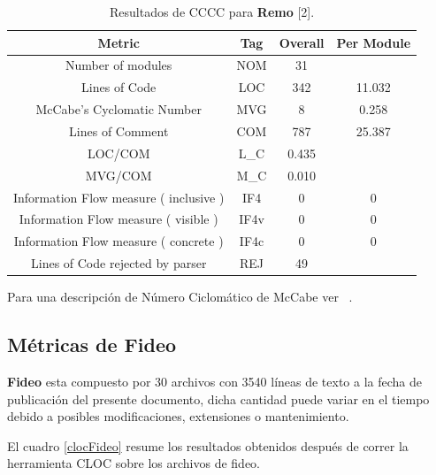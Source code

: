 \begin{table}[!htf]
    \begin{center}
	\begin{tabular}{|c|c|c|c|}
	\hline 
	Metric &Tag &Overall &Per Module \\
	 \hline 
	Number of modules &NOM & 31 &  \\
	 \hline 
	Lines of Code &LOC & 342 &11.032 \\
	 \hline 
	McCabe's Cyclomatic Number &MVG & 8 & 0.258 \\
	 \hline 
	Lines of Comment &COM & 787 & 25.387 \\
	 \hline 
	LOC/COM &L\_C & 0.435 &  \\
	 \hline 
	MVG/COM &M\_C & 0.010 &  \\
	 \hline 
	Information Flow measure (  inclusive ) &IF4 & 0 & 0 \\
	 \hline 
	Information Flow measure (  visible ) &IF4v & 0 & 0 \\
	 \hline 
	Information Flow measure (  concrete ) &IF4c & 0 & 0 \\
	 \hline 
	Lines of Code rejected by parser &REJ & 49 &  \\
	 \hline 
	\end{tabular} 
	\caption{Resultados de CCCC para \textbf{Remo} [2].}
	\label{ccccRemo}
\end{center}
\end{table}

\par Para una descripción de Número Ciclomático de McCabe ver ~\cite{McCabe}. 

\subsection{Métricas de Fideo}
\par \textbf{Fideo} esta compuesto por 30 archivos con 3540 líneas de texto a la fecha de publicación del presente documento, dicha cantidad puede variar en el tiempo debido a posibles modificaciones, extensiones o mantenimiento.

\par El cuadro \ref{clocFideo} resume los resultados obtenidos después de correr la herramienta CLOC sobre los archivos de fideo.

